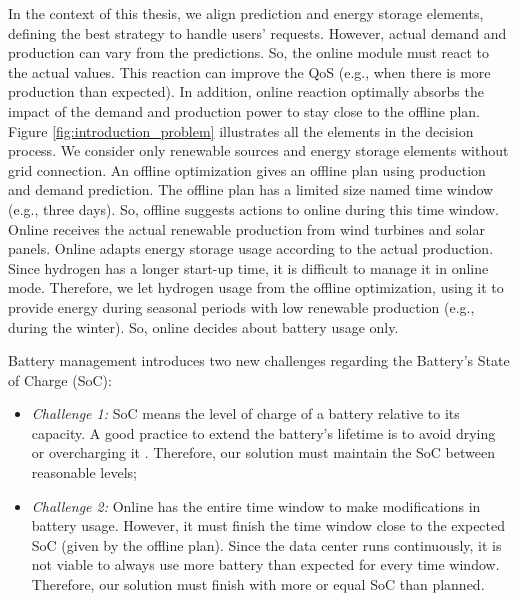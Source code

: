 In the context of this thesis, we align prediction and energy storage elements, defining the best strategy to handle users' requests. However, actual demand and production can vary from the predictions. So, the online module must react to the actual values. This reaction can improve the QoS (e.g., when there is more production than expected). In addition, online reaction optimally absorbs the impact of the demand and production power to stay close to the offline plan. Figure \ref{fig:introduction_problem} illustrates all the elements in the decision process. We consider only renewable sources and energy storage elements without grid connection. An offline optimization gives an offline plan using production and demand prediction. The offline plan has a limited size named time window (e.g., three days). So, offline suggests actions to online during this time window. Online receives the actual renewable production from wind turbines and solar panels. Online adapts energy storage usage according to the actual production. Since hydrogen has a longer start-up time, it is difficult to manage it in online mode. Therefore, we let hydrogen usage from the offline optimization, using it to provide energy during seasonal periods with low renewable production (e.g., during the winter). So, online decides about battery usage only. 

Battery management introduces two new challenges regarding the Battery's State of Charge (SoC):

\begin{itemize}
    \item \textit{Challenge 1:} SoC means the level of charge of a battery relative to its capacity. A good practice to extend the battery's lifetime is to avoid drying or overcharging it \cite{xu2016modeling}. Therefore, our solution must maintain the SoC between reasonable levels;
    \item \textit{Challenge 2:} Online has the entire time window to make modifications in battery usage. However, it must finish the time window close to the expected SoC (given by the offline plan). Since the data center runs continuously, it is not viable to always use more battery than expected for every time window. Therefore, our solution must finish with more or equal SoC than planned.
\end{itemize}

